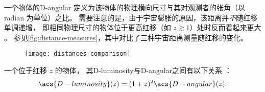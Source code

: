 一个物体的\acf{D-angular}
定义为该物体的物理横向尺寸与其对观测者的张角（以 \si{radian} 为单位）之比。
需要注意的是，由于宇宙膨胀的原因，该距离并\emph{不}随红移单调递增，
即相同物理尺寸的物体位于更高红移（如 $z \gtrsim 1$）处时反而看起来更大
\cite{hogg1999}。
参见\autoref{fig:distance-measures}，其中对比了三种宇宙距离测量随红移的变化。

\begin{figure}[htp]
  \centering
  \texttt{[image: distances-comparison]}
  \label{fig:distance-measures}
\end{figure}

一个位于红移 $z$ 的物体，
其\acl{D-luminosity}与\acl{D-angular}之间有以下关系
\cite{weinberg1972,hogg1999,ellis2007}：
\begin{equation}
  \label{eq:dl-da}
  \acs{D-luminosity}(z) = (1+z)^2 \acs{D-angular}(z) .
\end{equation}


